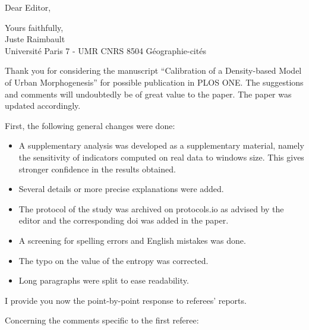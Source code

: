 \documentclass[11pt,a4paper,sans]{moderncv}        %
\begin{document}
\date{\today}
\opening{Dear Editor,}
\closing{Yours faithfully,\\
Juste Raimbault\\
Université Paris 7 - UMR CNRS 8504 Géographie-cités
}
\makelettertitle

\justify


Thank you for considering the manuscript ``Calibration of a Density-based Model of Urban Morphogenesis'' for possible publication in PLOS ONE. The suggestions and comments will undoubtedly be of great value to the paper. The paper was updated accordingly.

First, the following general changes were done:

\begin{itemize}
	\item A supplementary analysis was developed as a supplementary material, namely the sensitivity of indicators computed on real data to windows size. This gives stronger confidence in the results obtained.
	\item Several details or more precise explanations were added.
	\item The protocol of the study was archived on protocols.io as advised by the editor and the corresponding doi was added in the paper.
	\item A screening for spelling errors and English mistakes was done.
	\item The typo on the value of the entropy was corrected.
	\item Long paragraphs were split to ease readability.
\end{itemize}


I provide you now the point-by-point response to referees' reports.

Concerning the comments specific to the first referee:
\end{document}
